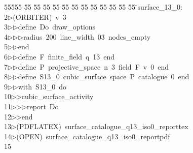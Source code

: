 %
%
\begin{tabbing}
55555 \= 55 \= 55 \= 55 \= 55 \= 55 \= 55 \= 55 \= 55 \= 55 \= 55 \= 55 \= 55 \= \>surface\_13\_0:\\[0pt]
2\>$\triangleright$\>(ORBITER)\ v\ 3\ \\[0pt]
3\>$\triangleright$\>$\triangleright$\>define\ Do\ draw\_options\ \\[0pt]
4\>$\triangleright$\>$\triangleright$\>$\triangleright$\>radius\ 200\ line\_width\ 03\ nodes\_empty\ \\[0pt]
5\>$\triangleright$\>$\triangleright$\>end\ \\[0pt]
6\>$\triangleright$\>$\triangleright$\>define\ F\ finite\_field\ q\ 13\ end\ \\[0pt]
7\>$\triangleright$\>$\triangleright$\>define\ P\ projective\_space\ n\ 3\ field\ F\ v\ 0\ end\ \\[0pt]
8\>$\triangleright$\>$\triangleright$\>define\ S13\_0\ cubic\_surface\ space\ P\ catalogue\ 0\ end\ \\[0pt]
9\>$\triangleright$\>$\triangleright$\>with\ S13\_0\ do\ \\[0pt]
10\>$\triangleright$\>$\triangleright$\>cubic\_surface\_activity\ \\[0pt]
11\>$\triangleright$\>$\triangleright$\>$\triangleright$\>report\ Do\ \\[0pt]
12\>$\triangleright$\>$\triangleright$\>end\\[0pt]
13\>$\triangleright$\>(PDFLATEX)\ surface\_catalogue\_q13\_iso0\_reporttex\\[0pt]
14\>$\triangleright$\>(OPEN)\ surface\_catalogue\_q13\_iso0\_reportpdf\\[0pt]
15\>\end{tabbing}
